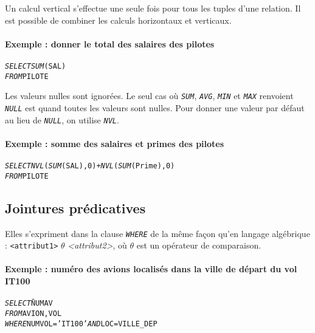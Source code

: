\documentclass[10pt]{article}
\begin{document}
			Un calcul vertical s'effectue une seule fois pour tous les tuples d'une relation. Il est possible de combiner les calculs horizontaux et verticaux.
			\paragraph{Exemple : donner le total des salaires des pilotes}
			\begin{alltt}
				\begin{tabbing}
					\emph{SELECT} \= \emph{SUM}(SAL)\\
					\emph{FROM} \> PILOTE
				\end{tabbing}
			\end{alltt}
			
			Les valeurs nulles sont ignorées. Le seul cas où \emph{\texttt{SUM}}, \emph{\texttt{AVG}}, \emph{\texttt{MIN}} et \emph{\texttt{MAX}} renvoient \emph{\texttt{NULL}} est quand toutes les valeurs sont nulles. Pour donner une valeur par défaut au lieu de \emph{\texttt{NULL}}, on utilise \emph{\texttt{NVL}}.\index{NVL}
			
			\paragraph{Exemple : somme des salaires et primes des pilotes}
			\begin{alltt}
				\begin{tabbing}
					\emph{SELECT} \= \emph{NVL}(\emph{SUM}(SAL),0) + \emph{NVL}(\emph{SUM}(Prime),0)\\
					\emph{FROM} \> PILOTE
				\end{tabbing}
			\end{alltt}
			
		\subsection{Jointures prédicatives}
			Elles s'expriment dans la clause \emph{\texttt{WHERE}} de la même façon qu'en langage algébrique : \texttt{<attribut1>} $\theta$ \emph{<attribut2>}, où $\theta$ est un opérateur de comparaison.
			
			\paragraph{Exemple : numéro des avions localisés dans la ville de départ du vol IT100}
				\begin{alltt}
					\begin{tabbing}
						\emph{SELECT} \= NUMAV\\
						\emph{FROM} \> AVION, VOL\\
						\emph{WHERE} \> NUMVOL='IT100' \emph{AND} LOC=VILLE_DEP
					\end{tabbing}
				\end{alltt}
\end{document}
